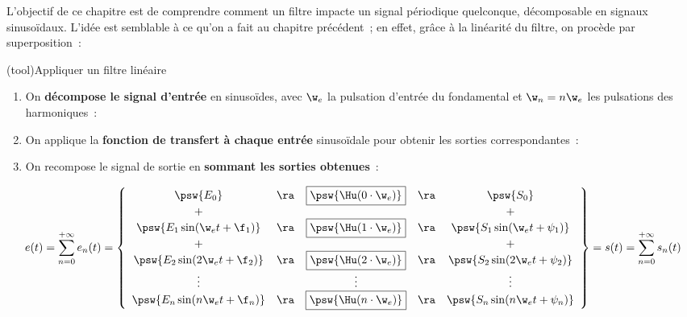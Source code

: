 \documentclass[../../main/main.tex]{subfiles}
\begin{document}
L'objectif de ce chapitre est de comprendre comment un filtre impacte un signal
périodique quelconque, décomposable en signaux sinusoïdaux. L'idée est semblable
à ce qu'on a fait au chapitre précédent~; en effet, grâce à la linéarité du
filtre, on procède par superposition~:
\begin{tcb*}[breakable](tool){Appliquer un filtre linéaire}
	\begin{enumerate}
		\item On \textbf{décompose le signal d'entrée} en sinusoïdes, avec $\w_e$ la pulsation
		      d'entrée du fondamental et $\w_n = n\w_e$ les pulsations des harmoniques~:
		      \psw{%
			      \[
				      e(t) = E_0 + \sum_{n=1}^{+\infty} E_n \sin(\w_n t + \f_n)
			      \]
		      }%
		      \vspace{-15pt}
		\item On applique la \textbf{fonction de transfert à chaque entrée}
		      sinusoïdale pour obtenir les sorties correspondantes~:
		      \psw{%
			      \[
				      s_n(t) = S_n \sin(\w_n t + \psi_n)
				      \qav
				      S_n = E_n \times \abs{\Hu(\jw_n)}
				      \qet
				      \psi_n = \f_n + \arg*{\Hu(\jw_n})
			      \]
		      }%
		      \vspace{-15pt}
		\item On recompose le signal de sortie en \textbf{sommant les sorties obtenues}~:
	\end{enumerate}
	\[
		e(t) = \sum_{n=0}^{+\infty} e_n(t) =
		\left\{
		\begin{array}{ccccc}
			\psw{E_0}                     & \ra & \fbox{$\psw{\Hu(0\cdot\w_e)}$} & \ra & \psw{S_0}
			\\
			+                             &     &                                &     & +
			\\
			\psw{E_1\sin(\w_e t + \f_1)}  & \ra & \fbox{$\psw{\Hu(1\cdot\w_e)}$} & \ra & \psw{S_1\sin(\w_e t + \psi_1)}
			\\
			+                             &     &                                &     & +
			\\
			\psw{E_2\sin(2\w_e t + \f_2)} & \ra & \fbox{$\psw{\Hu(2\cdot\w_e)}$} & \ra & \psw{S_2\sin(2\w_e t + \psi_2)}
			\\
			\vdots                        &     & \vdots                         &     & \vdots
			\\
			\psw{E_n\sin(n\w_e t + \f_n)} & \ra & \fbox{$\psw{\Hu(n\cdot\w_e)}$} & \ra & \psw{S_n\sin(n\w_e t + \psi_n)}
		\end{array}
		\right\} = s(t) = \sum_{n=0}^{+\infty}s_n(t)
	\]
\end{tcb*}
\end{document}
